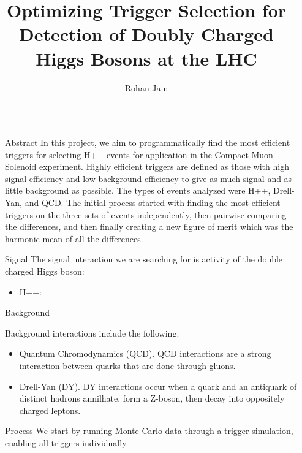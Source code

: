 \documentclass[final]{beamer}
\title{Optimizing Trigger Selection for Detection of Doubly Charged Higgs Bosons at the LHC}
\author{Rohan Jain}
\institute[shortinst]{ {\texttt{rjain@imsa.edu} \\

Illinois Mathematics and Science Academy
}}
\newlength{\sepwidth}
\newlength{\colwidth}
\newcommand{\separatorcolumn}{\begin{column}{\sepwidth}\end{column}}
\begin{document}
\begin{frame}[t]
\begin{columns}[t]
\separatorcolumn

\begin{column}{\colwidth}
  \begin{block}{Abstract}
    In this project, we aim to programmatically find the most efficient triggers for selecting H++ events for application in the Compact Muon Solenoid experiment. Highly efficient triggers are defined as those with high signal efficiency and low background efficiency to give as much signal and as little background as possible. The types of events analyzed were H++, Drell-Yan, and QCD. The initial process started with finding the most efficient triggers on the three sets of events independently, then pairwise comparing the differences, and then finally creating a new figure of merit which was the harmonic mean of all the differences. 
  \end{block}

\begin{block}{Signal}
  The signal interaction we are searching for is activity of the double charged Higgs boson:

  \begin{itemize}
    \item H++: 
  \end{itemize}
\end{block}

  \begin{block}{Background}

    Background interactions include the following:

    \begin{itemize}
      \item Quantum Chromodynamics (QCD). QCD interactions are a strong interaction between quarks that are done through gluons. 
      \item Drell-Yan (DY). DY interactions occur when a quark and an antiquark of distinct hadrons annilhate, form a Z-boson, then decay into oppositely charged leptons.
    \end{itemize}
  \end{block}

  \begin{block}{Process}
    We start by running Monte Carlo data through a trigger simulation, enabling all triggers individually.


\end{block}
\end{column}
\end{columns}
\end{frame}
\end{document}
